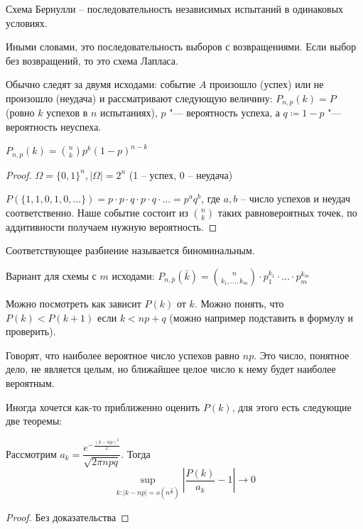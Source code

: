 \begin{Def}
Схема Бернулли -- последовательность независимых испытаний в одинаковых условиях.    
\end{Def}

\begin{Rem}
Иными словами, это последовательность выборов с возвращениями.
Если выбор без возвращений, то это схема Лапласа.
\end{Rem}

Обычно следят за двумя исходами: событие $A$ произошло (успех) или не произошло (неудача) и рассматривают следующую величину:
$P_{n,p}(k) = P$(ровно $k$ успехов в $n$ испытаниях), $p$ "--- вероятность успеха, а $q \coloneq 1-p$ "--- вероятность неуспеха.

\begin{theorem}
    $P_{n,p}(k) = {n \choose k} p^k (1-p)^{n-k}$
\end{theorem}
\begin{proof}
    $\Omega = \{0, 1\}^n, |\Omega| = 2^n$ (1 -- успех, 0 -- неудача)

    $P(\{1, 1, 0, 1, 0, \dots \}) = p \cdot p \cdot q \cdot p \cdot q \cdot \dots = p^{a}q^{b}$, где $a, b$ -- число успехов и неудач соответственно.
    Наше событие состоит из ${n \choose k}$ таких равновероятных точек, по аддитивности получаем нужную вероятность.
\end{proof}                                                                  

\begin{Def}
Соответствующее разбиение называется биноминальным.
\end{Def}

Вариант для схемы с $m$ исходами: $P_{n, \bar p}(\bar k) = \binom{n}{k_1, \dots, k_m} \cdot p_1^{k_1} \cdot \dots \cdot p_m^{k_m}$


Можно посмотреть как зависит $P(k)$ от $k$. Можно понять, что $P(k) < P(k + 1)$ если $k < np + q$ (можно например подставить в формулу и проверить).

Говорят, что наиболее вероятное число успехов равно $np$. Это число, понятное дело, не является целым, но ближайшее целое число к нему будет наиболее вероятным.

Иногда хочется как-то приближенно оценить $P(k)$, для этого есть следующие две теоремы:
\begin{theorem}
Рассмотрим $a_k = \dfrac{e^{-\frac{(k - np)^2}{2}}}{\sqrt{2\pi npq}}$. Тогда
$$\sup_{k\colon |k - np| = o(n^{\frac23})} |\frac{P(k)}{a_k} - 1| \to 0$$
\end{theorem}
\begin{proof}
Без доказательства
\end{proof}
